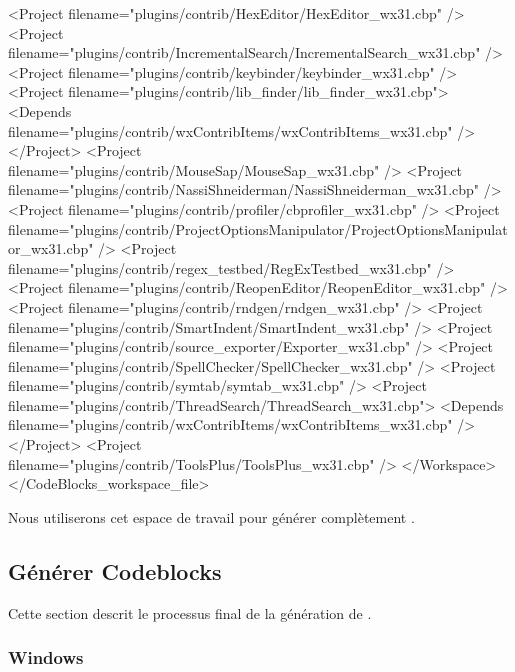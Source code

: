 \begin{code}
    <Project filename="plugins/contrib/HexEditor/HexEditor_wx31.cbp" />
    <Project filename="plugins/contrib/IncrementalSearch/IncrementalSearch_wx31.cbp" />
    <Project filename="plugins/contrib/keybinder/keybinder_wx31.cbp" />
    <Project filename="plugins/contrib/lib_finder/lib_finder_wx31.cbp">
      <Depends filename="plugins/contrib/wxContribItems/wxContribItems_wx31.cbp" />
    </Project>
    <Project filename="plugins/contrib/MouseSap/MouseSap_wx31.cbp" />
    <Project filename="plugins/contrib/NassiShneiderman/NassiShneiderman_wx31.cbp" />
    <Project filename="plugins/contrib/profiler/cbprofiler_wx31.cbp" />
    <Project filename="plugins/contrib/ProjectOptionsManipulator/ProjectOptionsManipulator_wx31.cbp" />
    <Project filename="plugins/contrib/regex_testbed/RegExTestbed_wx31.cbp" />
    <Project filename="plugins/contrib/ReopenEditor/ReopenEditor_wx31.cbp" />
    <Project filename="plugins/contrib/rndgen/rndgen_wx31.cbp" />
    <Project filename="plugins/contrib/SmartIndent/SmartIndent_wx31.cbp" />
    <Project filename="plugins/contrib/source_exporter/Exporter_wx31.cbp" />
    <Project filename="plugins/contrib/SpellChecker/SpellChecker_wx31.cbp" />
    <Project filename="plugins/contrib/symtab/symtab_wx31.cbp" />
    <Project filename="plugins/contrib/ThreadSearch/ThreadSearch_wx31.cbp">
      <Depends filename="plugins/contrib/wxContribItems/wxContribItems_wx31.cbp" />
    </Project>
    <Project filename="plugins/contrib/ToolsPlus/ToolsPlus_wx31.cbp" />
  </Workspace>
</CodeBlocks_workspace_file>
\end{code}


Nous utiliserons cet espace de travail pour générer complètement \codeblocks.


\subsection{Générer Codeblocks}

Cette section descrit le processus final de la génération de \codeblocks.

\subsubsection{Windows}

